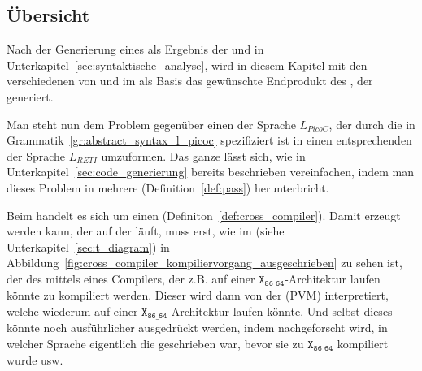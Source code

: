 \subsection{Übersicht}
Nach der Generierung eines  als Ergebnis der  und  in Unterkapitel~\ref{sec:syntaktische_analyse}, wird in diesem Kapitel mit den verschiedenen  von  und  im  als Basis das gewünschte Endprodukt des , der  generiert.

Man steht nun dem Problem gegenüber einen  der Sprache $L_{PicoC}$, der durch die  in Grammatik~\ref{gr:abstract_syntax_l_picoc} spezifiziert ist in einen entsprechenden  der Sprache $L_{RETI}$ umzuformen. Das ganze lässt sich, wie in Unterkapitel~\ref{sec:code_generierung} bereits beschrieben vereinfachen, indem man dieses Problem in mehrere  (Definition~\ref{def:pass}) herunterbricht.


Beim  handelt es sich um einen  (Definiton~\ref{def:cross_compiler}). Damit  erzeugt werden kann, der auf der  läuft, muss erst, wie im  (siehe Unterkapitel~\ref{sec:t_diagram}) in Abbildung~\ref{fig:cross_compiler_kompiliervorgang_ausgeschrieben} zu sehen ist, der  des  mittels eines Compilers, der z.B. auf einer $\mathtt{X_{86\_64}}$-Architektur laufen könnte zu  kompiliert werden. Dieser  wird dann von der  (PVM) interpretiert, welche wiederum auf einer $\mathtt{X_{86\_64}}$-Architektur laufen könnte. Und selbst dieses  könnte noch ausführlicher ausgedrückt werden, indem nachgeforscht wird, in welcher Sprache eigentlich die  geschrieben war, bevor sie zu $\mathtt{X_{86\_64}}$ kompiliert wurde usw.

